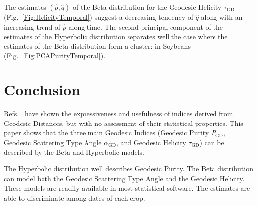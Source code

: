 \documentclass[journal]{IEEEtran}
\begin{document}
{The estimates $(\widehat p, \widehat q)$ of the Beta distribution for the Geodesic Helicity $\tau_{\text{GD}}$ (Fig.~\ref{Fig:HelicityTemporal}) suggest a decreasing tendency of $\widehat q$ along with an increasing trend of $\widehat p$ along time.
The second principal component of the estimates of the Hyperbolic distribution separates well the case where the estimates of the Beta distribution form a cluster: in Soybeans (Fig.~\ref{Fig:PCAPurityTemporal}). 


\section{Conclusion}

Refs.~\cite{ClassificationPolSARGeodesic,
	AGeneralizedVolumeScatteringModelBasedVegetationIndexfromPolarimetricSARData2019,
	NovelTechniquesforBuiltupAreaExtractionfromPolarimetricSARImages2019,
	APolSARScatteringPowerFactorizationFrameworkandNovelRollInvariantParametersBasedUnsupervisedClassificationSchemeUsingaGeodesicDistanceinpress,
	ChangeDetectionPolSARGeodesicDistanceBetweenScatteringMechanisms,
	ARadarVegetationIndexforCropMonitoringUsingCompactPolarimetricSARData}
have shown the expressiveness and usefulness of indices derived from Geodesic Distances, but with no assessment of their statistical properties.
This paper shows that the three main Geodesic Indices (Geodesic Purity $P_{\text{GD}}$,
Geodesic Scattering Type Angle $\alpha_{\text{GD}}$, and
Geodesic Helicity $\tau_{\text{GD}}$) can be described by the Beta and Hyperbolic models.

The Hyperbolic distribution well describes Geodesic Purity.
The Beta distribution can model both the Geodesic Scattering Type Angle and the Geodesic Helicity.
These models are readily available in most statistical software.
The estimates are able to discriminate among dates of each crop.



}
\end{document}
